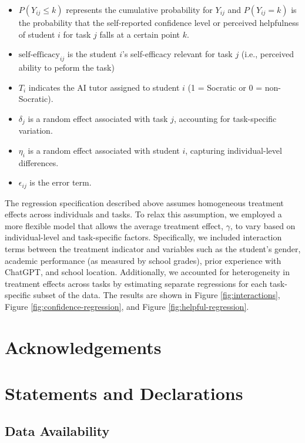 \documentclass[
  12pt,
]{article}
\begin{document}
\begin{itemize}
\item
  \(P(Y_{ij} \leq k)\) represents the cumulative probability for \(Y_{ij}\) and \(P(Y_{ij} = k)\) is the probability that the self-reported confidence level or perceived helpfulness of student \(i\) for task \(j\) falls at a certain point \(k\).
\item
  \(\text{self-efficacy}_{ij}\) is the student \(i\)'s self-efficacy relevant for task \(j\) (i.e., perceived ability to peform the task)
\item
  \(T_i\) indicates the AI tutor assigned to student \(i\) (1 = Socratic or 0 = non-Socratic).
\item
  \(\delta_j\) is a random effect associated with task \(j\), accounting for task-specific variation.
\item
  \(\eta_i\) is a random effect associated with student \(i\), capturing individual-level differences.
\item
  \(\epsilon_{ij}\) is the error term.
\end{itemize}

The regression specification described above assumes homogeneous treatment effects across individuals and tasks. To relax this assumption, we employed a more flexible model that allows the average treatment effect, \(\gamma\), to vary based on individual-level and task-specific factors. Specifically, we included interaction terms between the treatment indicator and variables such as the student's gender, academic performance (as measured by school grades), prior experience with ChatGPT, and school location. Additionally, we accounted for heterogeneity in treatment effects across tasks by estimating separate regressions for each task-specific subset of the data. The results are shown in Figure \ref{fig:interactions}, Figure \ref{fig:confidence-regression}, and Figure \ref{fig:helpful-regression}.

\section{Acknowledgements}\label{acknowledgements}

\section{Statements and Declarations}\label{statements-and-declarations}

\subsection{Data Availability}\label{data-availability}
\end{document}

